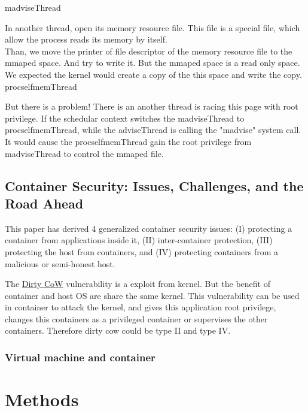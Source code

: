 \documentclass[12pt,a4paper,oneside,draft]{IEEEconf}
\begin{document}
\hypertarget{madvise}{madviseThread}


In another thread, open its memory resource file. This file is a special file, which allow
the process reads its memory by itself.\\
Than, we move the printer of file descriptor of the memory resource file to the mmaped
space. And try to write it. But the mmaped space is a read only space. We expected the
kernel would create a copy of the this space and write the copy\cite{root_exploit}.
\hypertarget{procself}{procselfmemThread}


But there is a problem! There is an another thread is racing this page with root privilege.
If the schedular context switches the madviseThread to procselfmemThread, while the
adviseThread is calling the "madvise" system call. It would cause the procselfmemThread
gain the root privilege from madviseThread to control the mmaped file.

\subsection{Container Security: Issues, Challenges, and the Road Ahead\cite{Road_Ahead}}
This paper has derived 4 generalized container security issues: (\RN{1}) protecting a
container from applications inside it, (\RN{2}) inter-container protection, (\RN{3})
protecting the host from containers, and (\RN{4}) protecting containers from a malicious
or semi-honest host.\cite{Road_Ahead}

The \hyperlink{dirty cow}{Dirty CoW} vulnerability is a exploit from kernel. But the benefit
of container and host OS are share the same kernel. This vulnerability can be used in
container to attack the kernel, and gives this application root privilege, changes this
containers as a privileged container or supervises the other containers. Therefore dirty
cow could be type \RN{2} and type \RN{4}.

\subsubsection{Virtual machine and container}



\section{Methods}
\end{document}
